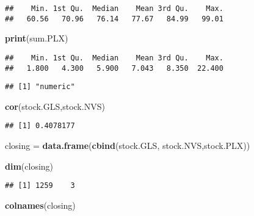 \documentclass[
]{article}
\newenvironment{Shaded}{\begin{snugshade}}{\end{snugshade}}
\newcommand{\KeywordTok}[1]{\textcolor[rgb]{0.13,0.29,0.53}{\textbf{#1}}}
\newcommand{\NormalTok}[1]{#1}
\newcommand{\OperatorTok}[1]{\textcolor[rgb]{0.81,0.36,0.00}{\textbf{#1}}}
\newcommand{\StringTok}[1]{\textcolor[rgb]{0.31,0.60,0.02}{#1}}
\begin{document}
\begin{verbatim}
##    Min. 1st Qu.  Median    Mean 3rd Qu.    Max. 
##   60.56   70.96   76.14   77.67   84.99   99.01
\end{verbatim}

\begin{Shaded}
\begin{Highlighting}[]
\KeywordTok{print}\NormalTok{(sum.PLX)}
\end{Highlighting}
\end{Shaded}

\begin{verbatim}
##    Min. 1st Qu.  Median    Mean 3rd Qu.    Max. 
##   1.800   4.300   5.900   7.043   8.350  22.400
\end{verbatim}

\begin{Shaded}
\end{Shaded}

\begin{verbatim}
## [1] "numeric"
\end{verbatim}

\begin{Shaded}
\begin{Highlighting}[]
\KeywordTok{cor}\NormalTok{(stock.GLS,stock.NVS)}
\end{Highlighting}
\end{Shaded}

\begin{verbatim}
## [1] 0.4078177
\end{verbatim}

\begin{Shaded}
\begin{Highlighting}[]
\NormalTok{closing =}\StringTok{ }\KeywordTok{data.frame}\NormalTok{(}\KeywordTok{cbind}\NormalTok{(stock.GLS, stock.NVS,stock.PLX))}

\KeywordTok{dim}\NormalTok{(closing)}
\end{Highlighting}
\end{Shaded}

\begin{verbatim}
## [1] 1259    3
\end{verbatim}

\begin{Shaded}
\begin{Highlighting}[]
\KeywordTok{colnames}\NormalTok{(closing)}
\end{Highlighting}
\end{Shaded}
\end{document}
